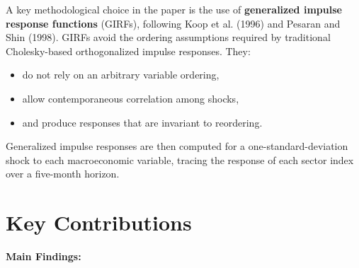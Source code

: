 \documentclass{article}
\begin{document}
\noindent A key methodological choice in the paper is the use of 
\textbf{generalized impulse response functions} (GIRFs), following Koop et al. (1996) 
and Pesaran and Shin (1998). GIRFs avoid the ordering assumptions required by 
traditional Cholesky-based orthogonalized impulse responses. They:

\begin{itemize}
    \item do not rely on an arbitrary variable ordering,
    \item allow contemporaneous correlation among shocks,
    \item and produce responses that are invariant to reordering.
\end{itemize}


\noindent Generalized impulse responses are then computed for a one-standard-deviation shock to each macroeconomic variable, tracing the response of each sector index over a five-month horizon.

\section{Key Contributions}

\noindent \textbf{Main Findings:}
\end{document}
